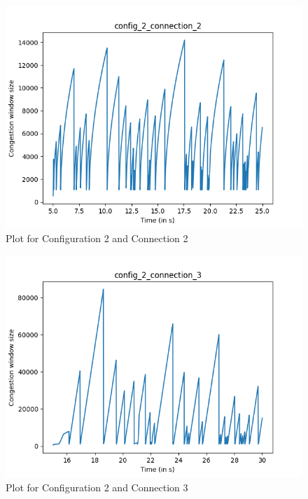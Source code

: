 \documentclass{article}
\begin{document}
\begin{figure}[H]
    \centering
    \includegraphics[scale = 0.8]{Q3/outputs/plots/config_2_connection_2.png}
    \caption{Plot for Configuration 2 and Connection 2}
\end{figure}

\begin{figure}[H]
    \centering
    \includegraphics[scale = 0.8]{Q3/outputs/plots/config_2_connection_3.png}
    \caption{Plot for Configuration 2 and Connection 3}
\end{figure}
\end{document}

